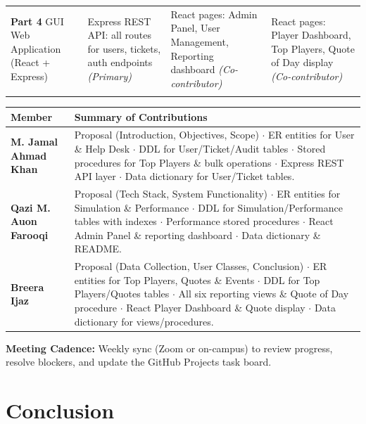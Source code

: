 \documentclass[12pt,a4paper]{article}
\begin{document}
\begin{longtable}{p{3.8cm} p{3.5cm} p{3.5cm} p{3.5cm}}
    \textbf{Part 4} \newline
    GUI Web Application
    (React + Express)&
    Express REST API:
    all routes for users,
    tickets, auth endpoints \newline
    \textit{(Primary)} &
    React pages: Admin
    Panel, User Management,
    Reporting dashboard \newline
    \textit{(Co-contributor)} &
    React pages: Player
    Dashboard, Top Players,
    Quote of Day display \newline
    \textit{(Co-contributor)} \\[8pt]

    &
    &
    &
    \\

    \bottomrule
\end{longtable}

\begin{longtable}{>{\bfseries}p{4cm} p{9.5cm}}
    \toprule
    Member & Summary of Contributions \\
    \midrule
    \endhead
    M. Jamal Ahmad Khan &
    Proposal (Introduction, Objectives, Scope) $\cdot$ ER entities for User \&
    Help Desk $\cdot$ DDL for User/Ticket/Audit tables $\cdot$ Stored procedures
    for Top Players \& bulk operations $\cdot$ Express REST API layer $\cdot$
    Data dictionary for User/Ticket tables. \\[5pt]
    Qazi M. Auon Farooqi &
    Proposal (Tech Stack, System Functionality) $\cdot$ ER entities for
    Simulation \& Performance $\cdot$ DDL for Simulation/Performance tables
    with indexes $\cdot$ Performance stored procedures $\cdot$ React Admin Panel
    \& reporting dashboard $\cdot$ Data dictionary \& README. \\[5pt]
    Breera Ijaz &
    Proposal (Data Collection, User Classes, Conclusion) $\cdot$ ER entities
    for Top Players, Quotes \& Events $\cdot$ DDL for Top Players/Quotes tables
    $\cdot$ All six reporting views \& Quote of Day procedure $\cdot$ React
    Player Dashboard \& Quote display $\cdot$ Data dictionary for
    views/procedures. \\
    \bottomrule
\end{longtable}

\noindent\textbf{Meeting Cadence:} Weekly sync (Zoom or on-campus) to review
progress, resolve blockers, and update the GitHub Projects task board.

\section{Conclusion}
\end{document}
